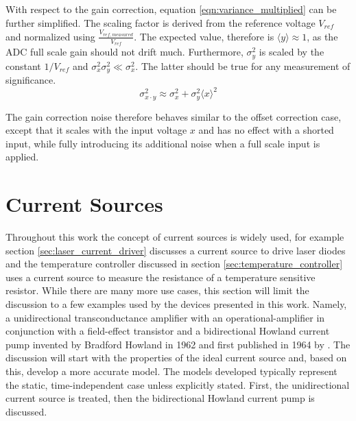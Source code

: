 With respect to the gain correction, equation \ref{eqn:variance_multiplied} can be further simplified. The scaling factor is derived from the reference voltage $V_{ref}$ and normalized using $\frac{V_{ref, measured}}{V_{ref}}$. The expected value, therefore is $\langle y \rangle \approx 1$, as the ADC full scale gain should not drift much. Furthermore, $\sigma_y^2$ is scaled by the constant $1/V_{ref}$ and $\sigma_x^2 \sigma_y^2 \ll \sigma_x^2$. The latter should be true for any measurement of significance.
\begin{equation}
    \sigma_{x \cdot y}^2 \approx \sigma_x^2 + \sigma_y^2 \langle x \rangle^2
\end{equation}

The gain correction noise therefore behaves similar to the offset correction case, except that it scales with the input voltage $x$ and has no effect with a shorted input, while fully introducing its additional noise when a full scale input is applied.



\clearpage
\section{Current Sources}
Throughout this work the concept of current sources is widely used, for example section \ref{sec:laser_current_driver} discusses a current source to drive laser diodes and the temperature controller discussed in section \ref{sec:temperature_controller} uses a current source to measure the resistance of a temperature sensitive resistor. While there are many more use cases, this section will limit the discussion to a few examples used by the devices presented in this work. Namely, a unidirectional transconductance amplifier with an operational-amplifier in conjunction with a field-effect transistor and a bidirectional Howland current pump invented by Bradford Howland in 1962 and first published in 1964 by \citeauthor{howland_current_source} \cite{howland_current_source}. The discussion will start with the properties of the ideal current source and, based on this, develop a more accurate model. The models developed typically represent the static, time-independent case unless explicitly stated. First, the unidirectional current source is treated, then the bidirectional Howland current pump is discussed.

